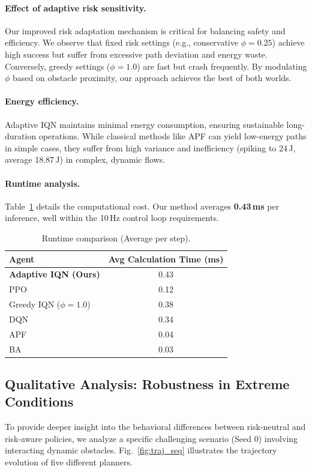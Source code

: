 \paragraph{Effect of adaptive risk sensitivity.}
Our improved risk adaptation mechanism is critical for balancing safety and efficiency. We observe that fixed risk settings (e.g., conservative $\phi=0.25$) achieve high success but suffer from excessive path deviation and energy waste. Conversely, greedy settings ($\phi=1.0$) are fast but crash frequently. By modulating $\phi$ based on obstacle proximity, our approach achieves the best of both worlds.

\paragraph{Energy efficiency.}
Adaptive IQN maintains minimal energy consumption, ensuring sustainable long-duration operations. While classical methods like APF can yield low-energy paths in simple cases, they suffer from high variance and inefficiency (spiking to 24\,J, average 18.87\,J) in complex, dynamic flows.


\paragraph{Runtime analysis.}
Table~\ref{tab:runtime} details the computational cost. Our method averages \textbf{0.43\,ms} per inference, well within the 10\,Hz control loop requirements.

\begin{table}[t]
\centering
\caption{Runtime comparison (Average per step).}
\label{tab:runtime}
\begin{tabular}{lc}
\hline
Agent & Avg Calculation Time (ms) \\
\hline
\textbf{Adaptive IQN (Ours)} & 0.43 \\
PPO & 0.12 \\
Greedy IQN ($\phi=1.0$) & 0.38 \\
DQN  & 0.34 \\
APF  & 0.04 \\
BA   & 0.03 \\
\hline
\end{tabular}
\end{table}

\subsection{Qualitative Analysis: Robustness in Extreme Conditions}
To provide deeper insight into the behavioral differences between risk-neutral and risk-aware policies, we analyze a specific challenging scenario (Seed 0) involving interacting dynamic obstacles. Fig.~\ref{fig:traj_seq} illustrates the trajectory evolution of five different planners.

